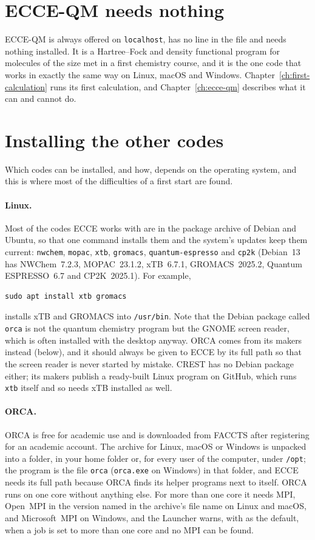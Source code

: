 \section{ECCE-QM needs nothing}
ECCE-QM is always offered on \texttt{localhost}, has no line in the file and needs nothing installed. It is a Hartree--Fock and density functional program for molecules of the size met in a first chemistry course, and it is the one code that works in exactly the same way on Linux, macOS and Windows. Chapter~\ref{ch:first-calculation} runs its first calculation, and Chapter~\ref{ch:ecce-qm} describes what it can and cannot do.

\section{Installing the other codes}
Which codes can be installed, and how, depends on the operating system, and this is where most of the difficulties of a first start are found.

\paragraph{Linux.} Most of the codes ECCE works with are in the package archive of Debian and Ubuntu, so that one command installs them and the system's updates keep them current: \texttt{nwchem}, \texttt{mopac}, \texttt{xtb}, \texttt{gromacs}, \texttt{quantum-espresso} and \texttt{cp2k} (Debian~13 has NWChem~7.2.3, MOPAC~23.1.2, xTB~6.7.1, GROMACS~2025.2, Quantum ESPRESSO~6.7 and CP2K~2025.1). For example,
\begin{verbatim}
sudo apt install xtb gromacs
\end{verbatim}
installs xTB and GROMACS into \texttt{/usr/bin}. Note that the Debian package called \texttt{orca} is not the quantum chemistry program but the GNOME screen reader, which is often installed with the desktop anyway. ORCA comes from its makers instead (below), and it should always be given to ECCE by its full path so that the screen reader is never started by mistake. CREST has no Debian package either; its makers publish a ready-built Linux program on GitHub, which runs \texttt{xtb} itself and so needs xTB installed as well.

\paragraph{ORCA.} ORCA is free for academic use and is downloaded from FACCTS after registering for an academic account. The archive for Linux, macOS or Windows is unpacked into a folder, in your home folder or, for every user of the computer, under \texttt{/opt}; the program is the file \texttt{orca} (\texttt{orca.exe} on Windows) in that folder, and ECCE needs its full path because ORCA finds its helper programs next to itself. ORCA runs on one core without anything else. For more than one core it needs MPI, Open~MPI in the version named in the archive's file name on Linux and macOS, and Microsoft~MPI on Windows, and the Launcher warns, with  as the default, when a job is set to more than one core and no MPI can be found.

